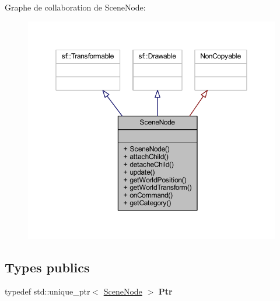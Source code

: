 Graphe de collaboration de Scene\+Node\+:\nopagebreak
\begin{figure}[H]
\begin{center}
\leavevmode
\includegraphics[width=350pt]{class_scene_node__coll__graph}
\end{center}
\end{figure}
\subsection*{Types publics}
\begin{DoxyCompactItemize}
\item 
typedef std\+::unique\+\_\+ptr$<$ \hyperlink{class_scene_node}{Scene\+Node} $>$ {\bfseries Ptr}\hypertarget{class_scene_node_aaf5c9ad8475874b51b70e400822f2e9a}{}\label{class_scene_node_aaf5c9ad8475874b51b70e400822f2e9a}

\end{DoxyCompactItemize}
